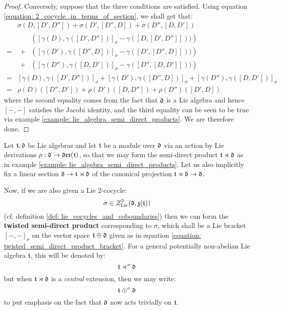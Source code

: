\begin{proof}
                Conversely, suppose that the three conditions are satisfied. Using equation \eqref{equation: 2_cocycle_in_terms_of_section}, we shall get that:
                    $$
                        \begin{aligned}
                            & \sigma( D, [D', D''] ) + \sigma( D', [D'', D] ) + \sigma( D'', [D, D'] )
                            \\
                            = &
                            \begin{aligned}
                                & \left( [ \gamma(D), \gamma([D', D'']) ]_{\sigma} - \gamma( [D, [D', D'']] )) \right)
                                \\
                                + & \left( [ \gamma(D'), \gamma([D'', D]) ]_{\sigma} - \gamma( [D', [D'', D]] )) \right)
                                \\
                                + & \left( [ \gamma(D''), \gamma([D, D']) ]_{\sigma} - \gamma( [D'', [D, D']] )) \right)
                            \end{aligned}
                            \\
                            = & [ \gamma(D), \gamma([D', D'']) ]_{\sigma} + [ \gamma(D'), \gamma([D'', D]) ]_{\sigma} + [ \gamma(D''), \gamma([D, D']) ]_{\sigma}
                            \\
                            = & \rho(D)( [D'', D'] ) + \rho(D')( [D, D''] ) + \rho(D'')( [D', D] )
                        \end{aligned}
                    $$
                where the second equality comes from the fact that $\mathfrak{d}$ is a Lie algebra and hence $[-, -]$ satisfies the Jacobi identity, and the third equality can be seen to be true via example \ref{example: lie_algebra_semi_direct_products}. We are therefore done.
            \end{proof}
        \begin{definition} \label{def: twisted_semi_direct_products} 
            Let $\mathfrak{t}, \mathfrak{d}$ be Lie algebras and let $\mathfrak{t}$ be a module over $\mathfrak{d}$ via an action by Lie derivations $\rho: \mathfrak{d} \to \mathfrak{der}(\mathfrak{t})$, so that we may form the semi-direct product $\mathfrak{t} \rtimes \mathfrak{d}$ as in example \ref{example: lie_algebra_semi_direct_products}. Let us also implicitly fix a linear section $\mathfrak{d} \to \mathfrak{t} \rtimes \mathfrak{d}$ of the canonical projection $\mathfrak{t} \rtimes \mathfrak{d} \to \mathfrak{d}$.

            Now, if we are also given a Lie $2$-cocycle:
                $$\sigma \in Z^2_{\mathrm{Lie}}(\mathfrak{d}, \mathfrak{z}(\mathfrak{t}))$$
            (cf. definition \ref{def: lie_cocycles_and_coboundaries}) then we can form the \textbf{twisted semi-direct product} corresponding to $\sigma$, which shall be a Lie bracket $[-, -]_{\sigma}$ on the vector space $\mathfrak{t} \oplus \mathfrak{d}$ given as in equation \eqref{equation: twisted_semi_direct_product_bracket}. For a general potentially non-abelian Lie algebra $\mathfrak{t}$, this will be denoted by:
                $$\mathfrak{t} \rtimes^{\sigma} \mathfrak{d}$$
            but when $\mathfrak{t} \rtimes \mathfrak{d}$ is a \textit{central} extension, then we may write:
                $$\mathfrak{t} \oplus^{\sigma} \mathfrak{d}$$
            to put emphasis on the fact that $\mathfrak{d}$ now acts trivially on $\mathfrak{t}$.
        \end{definition}
